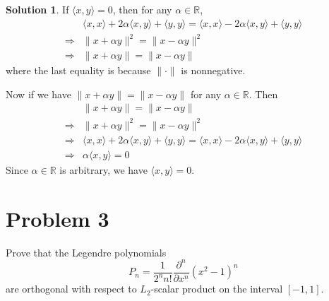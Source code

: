 \documentclass{article}
\theoremstyle{definition}
\newtheorem{solution}{Solution}
\begin{document}
\begin{solution}
If $\langle x,y\rangle=0$, then for any $\alpha\in\mathbb{R}$,
\begin{align*}
  &\langle x,x\rangle+2\alpha\langle x,y\rangle+\langle y,y\rangle=\langle x,x\rangle-2\alpha\langle x,y\rangle+\langle y,y\rangle\\
  \Rightarrow&\|x+\alpha y\|^2=\|x-\alpha y\|^2\\
  \Rightarrow&\|x+\alpha y\|=\|x-\alpha y\|
\end{align*}
where the last equality is because $\|\cdot\|$ is nonnegative.

Now if we have $\|x+\alpha y\|=\|x-\alpha y\|$ for any $\alpha\in\mathbb{R}$. Then
\begin{align*}
&\|x+\alpha y\|=\|x-\alpha y\|\\
\Rightarrow&\|x+\alpha y\|^2=\|x-\alpha y\|^2\\
\Rightarrow&\langle x,x\rangle+2\alpha\langle x,y\rangle+\langle y,y\rangle=\langle x,x\rangle-2\alpha\langle x,y\rangle+\langle y,y\rangle\\
\Rightarrow&\alpha\langle x,y\rangle=0
\end{align*}
Since $\alpha\in\mathbb{R}$ is arbitrary, we have $\langle x,y\rangle=0$.


\end{solution}




\section{Problem 3}
Prove that the Legendre polynomials
\begin{equation}
  P_n=\frac{1}{2^nn!}\frac{\partial^n}{\partial x^n}(x^2-1)^n
\end{equation}
are orthogonal with respect to $L_2$-scalar product on the interval $[-1,1]$.
\end{document}
